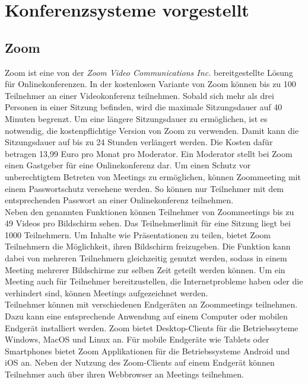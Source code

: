 \section{Konferenzsysteme vorgestellt}
\label{sec:konferenzsysteme_vorgestellt}
\subsection{Zoom}
Zoom ist eine von der \textit{Zoom Video Communications Inc.} bereitgestellte Lösung für Onlinekonferenzen.
\autocite[Vgl.][]{M_Zoom.o.J.b}
In der kostenlosen Variante von Zoom können bis zu 100 Teilnehmer an einer Videokonferenz teilnehmen.
Sobald sich mehr als drei Personen in einer Sitzung befinden, wird die maximale Sitzungsdauer auf 40 Minuten begrenzt.
Um eine längere Sitzungsdauer zu ermöglichen, ist es notwendig, die kostenpflichtige Version von Zoom zu verwenden.
Damit kann die Sitzungsdauer auf bis zu 24 Stunden verlängert werden. Die Kosten dafür betragen 13,99 Euro pro Monat pro Moderator.
Ein Moderator stellt bei Zoom einen Gastgeber für eine Onlinekonferenz dar.
Um einen Schutz vor unberechtigtem Betreten von Meetings zu ermöglichen, können Zoommeeting mit einem Passwortschutz versehene werden.
So können nur Teilnehmer mit dem entsprechenden Passwort an einer Onlinekonferenz teilnehmen.
\autocite[Vgl.][]{M_Mierke.2020}
\\
Neben den genannten Funktionen können Teilnehmer von Zoommeetings bis zu 49 Videos pro Bildschirm sehen.
Das Teilnehmerlimit für eine Sitzung liegt bei 1000 Teilnehmern.
Um Inhalte wie Präsentationen zu teilen, bietet Zoom Teilnehmern die Möglichkeit, ihren Bildschirm freizugeben.
Die Funktion kann dabei von mehreren Teilnehmern gleichzeitig genutzt werden, sodass in einem Meeting mehrerer Bildschirme zur selben Zeit geteilt werden können.
Um ein Meeting auch für Teilnehmer bereitzustellen, die Internetprobleme haben oder die verhindert sind, können Meetings aufgezeichnet werden.
\autocite[Vgl.][]{M_Zoom.o.J.b}
\\
Teilnehmer können mit verschiedenen Endgeräten an Zoommeetings teilnehmen.
Dazu kann eine entsprechende Anwendung auf einem Computer oder mobilen Endgerät installiert werden.
Zoom bietet Desktop-Clients für die Betriebssyteme Windows, MacOS und Linux an.
Für mobile Endgeräte wie Tablets oder Smartphones bietet Zoom Applikationen für die Betriebssysteme Android und iOS an.
Neben der Nutzung des Zoom-Clients auf einem Endgerät können Teilnehmer auch über ihren Webbrowser an Meetings teilnehmen.
\autocite[Vgl.][]{M_Zoom.o.J.}

